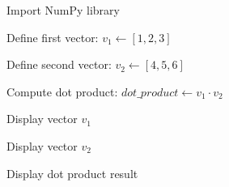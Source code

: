 \begin{algorithm}
\caption{Compute Dot Product of Two Vectors}
\begin{algorithmic}[1]

\STATE Import NumPy library

\STATE Define first vector:
\STATE $v_1 \gets [1, 2, 3]$

\STATE Define second vector:
\STATE $v_2 \gets [4, 5, 6]$

\STATE Compute dot product:
\STATE $dot\_product \gets v_1 \cdot v_2$

\STATE Display vector $v_1$

\STATE Display vector $v_2$

\STATE Display dot product result

\end{algorithmic}
\end{algorithm}